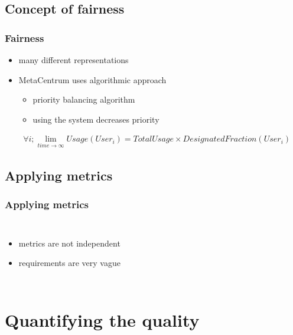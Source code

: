 \subsection{Concept of fairness}

\begin{frame}
	\frametitle{Fairness}
	\begin{itemize}
		\item many different representations
		\item MetaCentrum uses algorithmic approach
		\begin{itemize}
			\item priority balancing algorithm
			\item using the system decreases priority
		\end{itemize}
	\end{itemize}

	\begin{align*}
	& \forall i; \lim_{time \to \infty} Usage(User_i) = TotalUsage \times DesignatedFraction(User_i)
	\end{align*}
\end{frame}

\subsection{Applying metrics}

\begin{frame}
	\frametitle{Applying metrics}
	\begin{columns}
		\begin{itemize}
			\item metrics are not independent
			\item requirements are very vague
		\end{itemize}
	\end{columns}
\end{frame}

\section{Quantifying the quality}
